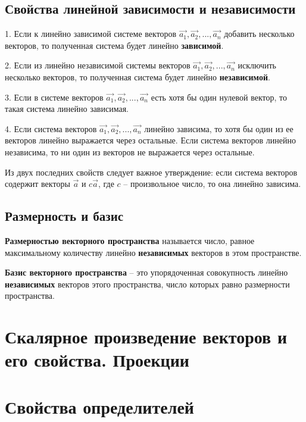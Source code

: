 \documentclass[12pt, fleqn]{extarticle}
\begin{document}
\subsection*{Свойства линейной зависимости и независимости}

1. Если к линейно зависимой системе векторов \(\overrightarrow{a_1}, \overrightarrow{a_2}, ..., \overrightarrow{a_n}\) добавить несколько векторов, то полученная система будет линейно \textbf{зависимой}.

2. Если из линейно независимой системы векторов \(\overrightarrow{a_1}, \overrightarrow{a_2}, ..., \overrightarrow{a_n}\) исключить несколько векторов, то полученная система будет линейно \textbf{независимой}.

3. Если в системе векторов \(\overrightarrow{a_1}, \overrightarrow{a_2}, ..., \overrightarrow{a_n}\) есть хотя бы один нулевой вектор, то такая система линейно зависимая.

4. Если система векторов \(\overrightarrow{a_1}, \overrightarrow{a_2}, ..., \overrightarrow{a_n}\) линейно зависима, то хотя бы один из ее векторов линейно выражается через остальные. Если система векторов линейно независима, то ни один из векторов не выражается через остальные.

Из двух последних свойств следует важное утверждение:
если система векторов содержит векторы \(\overrightarrow{a}\) и \(c \overrightarrow{a}\), где \(c\) – произвольное число, то она линейно зависима.

\subsection*{Размерность и базис}
\textbf{Размерностью векторного пространства} называется число, равное максимальному количеству линейно \textbf{независимых} векторов в этом пространстве.

\textbf{Базис векторного пространства} – это упорядоченная совокупность линейно \textbf{независимых} векторов этого пространства, число которых равно размерности пространства.

\newpage

\section*{Скалярное произведение векторов и его свойства. Проекции}

\newpage

\section*{Свойства определителей}\label{sec:det}
\end{document}

